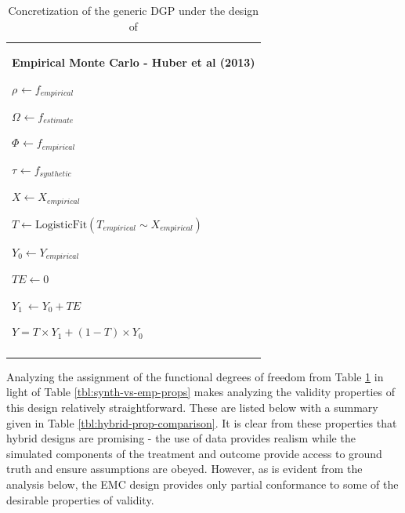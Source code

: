 \documentclass[../main.tex]{subfiles}
\begin{document}
\begin{table}[H]
             \centering
\begin{tabular}{p{3.14in}}
\hline
\multicolumn{1}{|p{3.14in}|}{\textbf{Empirical Monte Carlo - Huber et al (2013)} \par  \(  \rho _{} \leftarrow f_{empirical}~ \)  \par  \(  \Omega _{} \leftarrow f_{estimate} \)  \par  \(  \Phi _{} \leftarrow f_{empirical} \)  \par  \(  \tau_{} \leftarrow f_{synthetic}~ \)  \par  \( X \leftarrow X_{empirical} \)  \par  \( T \leftarrow \text{LogisticFit} \left(  T_{empirical} \sim X_{empirical} \right)  \)  \par  \( Y_{0} \leftarrow Y_{empirical} \)  \par  \( TE \leftarrow 0 \)  \par  \( Y_{1}~ \leftarrow Y_{0}+ TE \)  \par  \( Y = T \times Y_{1}+  \left( 1-T \right)  \times Y_{0} \)  \par } \\
\hhline{-}

\end{tabular}
\caption{Concretization of the generic DGP under the design of \textcite{Huber2013TheScore}}
\label{tbl:huber-hybrid}
\end{table}


\vspace{\baselineskip}
Analyzing the assignment of the functional degrees of freedom from Table \ref{tbl:huber-hybrid} in light of Table \ref{tbl:synth-vs-emp-props} makes analyzing the validity properties of this design relatively straightforward. These are listed below with a summary given in Table \ref{tbl:hybrid-prop-comparison}. It is clear from these properties that hybrid designs are promising - the use of data provides realism while the simulated components of the treatment and outcome provide access to ground truth and ensure assumptions are obeyed. However, as is evident from the analysis below, the EMC design provides only partial conformance to some of the desirable properties of validity.\par
\end{document}
